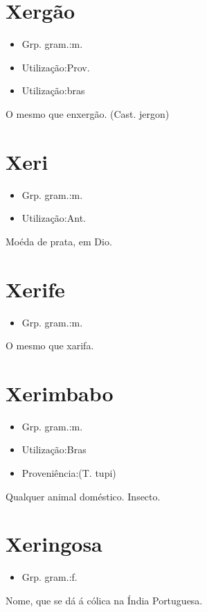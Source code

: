\section{Xergão}
\begin{itemize}
\item {Grp. gram.:m.}
\end{itemize}
\begin{itemize}
\item {Utilização:Prov.}
\end{itemize}
\begin{itemize}
\item {Utilização:bras}
\end{itemize}
O mesmo que \textunderscore enxergão\textunderscore .
(Cast. \textunderscore jergon\textunderscore )
\section{Xeri}
\begin{itemize}
\item {Grp. gram.:m.}
\end{itemize}
\begin{itemize}
\item {Utilização:Ant.}
\end{itemize}
Moéda de prata, em Dio.
\section{Xerife}
\begin{itemize}
\item {Grp. gram.:m.}
\end{itemize}
O mesmo que \textunderscore xarifa\textunderscore .
\section{Xerimbabo}
\begin{itemize}
\item {Grp. gram.:m.}
\end{itemize}
\begin{itemize}
\item {Utilização:Bras}
\end{itemize}
\begin{itemize}
\item {Proveniência:(T. tupi)}
\end{itemize}
Qualquer animal doméstico.
Insecto.
\section{Xeringosa}
\begin{itemize}
\item {Grp. gram.:f.}
\end{itemize}
Nome, que se dá á cólica na Índia Portuguesa.
